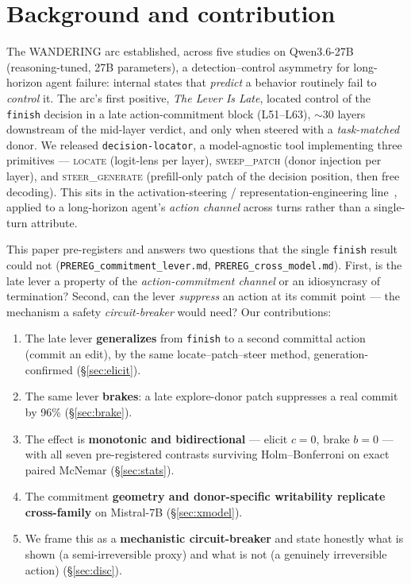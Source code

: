 \documentclass[11pt]{article}
\begin{document}
\section{Background and contribution}\label{sec:bg}
The WANDERING arc established, across five studies on Qwen3.6-27B (reasoning-tuned, 27B parameters), a
detection--control asymmetry for long-horizon agent failure: internal states that \emph{predict} a behavior
routinely fail to \emph{control} it. The arc's first positive, \emph{The Lever Is Late}, located control of the
\texttt{finish} decision in a late action-commitment block (L51--L63), $\sim$30 layers downstream of the
mid-layer verdict, and only when steered with a \emph{task-matched} donor. We released
\texttt{decision-locator}, a model-agnostic tool implementing three primitives --- \textsc{locate} (logit-lens
per layer), \textsc{sweep\_patch} (donor injection per layer), and \textsc{steer\_generate} (prefill-only patch
of the decision position, then free decoding). This sits in the activation-steering / representation-engineering line~\cite{actadd,repe}, applied to a long-horizon agent's \emph{action channel} across turns rather than a single-turn attribute.

This paper pre-registers and answers two questions that the single \texttt{finish} result could not
(\texttt{PREREG\_commitment\_lever.md}, \texttt{PREREG\_cross\_model.md}). First, is the late lever a property of
the \emph{action-commitment channel} or an idiosyncrasy of termination? Second, can the lever \emph{suppress} an
action at its commit point --- the mechanism a safety \emph{circuit-breaker} would need? Our contributions:
\begin{enumerate}\itemsep1pt
  \item The late lever \textbf{generalizes} from \texttt{finish} to a second committal action (commit an edit),
    by the same locate--patch--steer method, generation-confirmed (\S\ref{sec:elicit}).
  \item The same lever \textbf{brakes}: a late explore-donor patch suppresses a real commit by 96\%
    (\S\ref{sec:brake}).
  \item The effect is \textbf{monotonic and bidirectional} --- elicit $c{=}0$, brake $b{=}0$ --- with all seven
    pre-registered contrasts surviving Holm--Bonferroni on exact paired McNemar (\S\ref{sec:stats}).
  \item The commitment \textbf{geometry and donor-specific writability replicate cross-family} on Mistral-7B
    (\S\ref{sec:xmodel}).
  \item We frame this as a \textbf{mechanistic circuit-breaker} and state honestly what is shown (a
    semi-irreversible proxy) and what is not (a genuinely irreversible action) (\S\ref{sec:disc}).
\end{enumerate}
\end{document}
